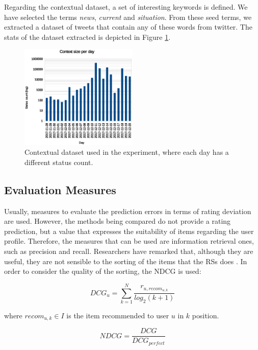 \documentclass[preprint]{elsarticle}
\begin{document}
\begin{spacing}{2}
Regarding the contextual dataset, a set of interesting keywords is defined. We have selected the terms \emph{news}, \emph{current} and \emph{situation}. From these seed terms, we extracted a dataset of tweets that contain any of these words from twitter. The stats of the dataset extracted is depicted in Figure \ref{fig:context-dataset-description}.

\begin{figure}[htb]
    \centering
    \includegraphics[width=0.5\textwidth]{figures/context-dataset-description.eps}
    \caption{Contextual dataset used in the experiment, where each day has a different status count.}
    \label{fig:context-dataset-description}
\end{figure}

\subsection{Evaluation Measures}

Usually, measures to evaluate the prediction errors in terms of rating deviation are used. However, the methods being compared do not provide a rating prediction, but a value that expresses the suitability of items regarding the user profile. Therefore, the measures that can be used are information retrieval ones, such as precision and recall. Researchers have remarked that, although they are useful, they are not sensible to the sorting of the items that the RSs does \cite{Gunawardana2015}. In order to consider the quality of the sorting, the NDCG is used:

\begin{equation}
	DCG_u = \sum_{k=1}^N\frac{r_{u,recom_{u,k}}}{log_2 (k+1)}
\end{equation}

\noindent where $recom_{u,k} \in I$ is the item recommended to user $u$ in $k$ position.

\begin{equation}
	NDCG = \frac{DCG}{DCG_{perfect}}
\end{equation}


\end{spacing}
\end{document}
